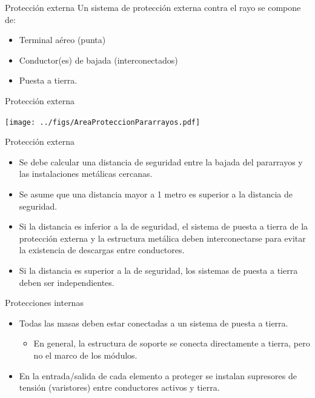 \documentclass[aspectratio=169, usenames,svgnames,dvipsnames]{beamer}
\begin{document}
\begin{frame}[label={sec:orgc9c2f62}]{Protección externa}
Un sistema de protección externa contra el rayo se compone de:

\begin{itemize}
\item Terminal aéreo (punta)

\item Conductor(es) de bajada (interconectados)

\item Puesta a tierra.
\end{itemize}
\end{frame}

\begin{frame}[label={sec:orga89135d}]{Protección externa}
\begin{center}
\texttt{[image: ../figs/AreaProteccionPararrayos.pdf]}
\end{center}
\end{frame}

\begin{frame}[label={sec:orgcfa4c4a}]{Protección externa}
\begin{itemize}
\item Se debe calcular una \alert{distancia de seguridad} entre la bajada del
pararrayos y las instalaciones metálicas cercanas.

\item Se asume que una distancia mayor a 1 metro es superior a la distancia
de seguridad.

\item \alert{Si la distancia es inferior a la de seguridad}, el sistema de puesta
a tierra de la protección externa y la estructura metálica deben
\alert{interconectarse} para evitar la existencia de descargas entre
conductores.

\item \alert{Si la distancia es superior a la de seguridad}, los sistemas de
puesta a tierra deben ser \alert{independientes}.
\end{itemize}
\end{frame}

\begin{frame}[label={sec:org5d7a6df}]{Protecciones internas}
\begin{itemize}
\item \alert{Todas las masas deben estar conectadas a un sistema de puesta a
tierra}.

\begin{itemize}
\item En general, la estructura de soporte se conecta directamente
a tierra, pero no el marco de los módulos.
\end{itemize}

\item En la entrada/salida de cada elemento a proteger se instalan
\alert{supresores de tensión (varistores)} entre conductores activos y
tierra.
\end{itemize}
\end{frame}
\end{document}
